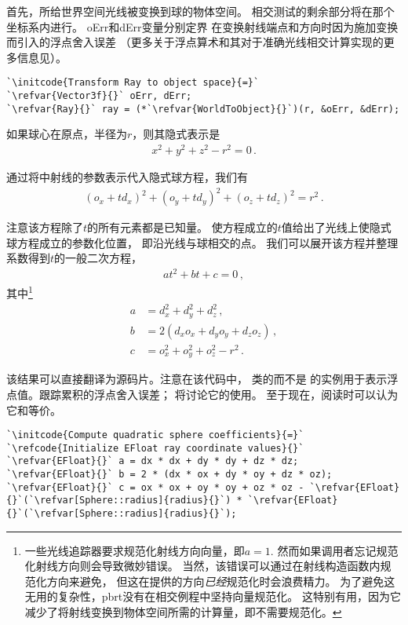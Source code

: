 首先，所给世界空间光线被变换到球的物体空间。
相交测试的剩余部分将在那个坐标系内进行。
{\ttfamily oErr}和{\ttfamily dErr}变量分别定界
在变换射线端点和方向时因为施加变换而引入的浮点舍入误差
（更多关于浮点算术和其对于准确光线相交计算实现的更多信息见）。
\begin{lstlisting}
`\initcode{Transform Ray to object space}{=}`
`\refvar{Vector3f}{}` oErr, dErr;
`\refvar{Ray}{}` ray = (*`\refvar{WorldToObject}{}`)(r, &oErr, &dErr);
\end{lstlisting}

如果球心在原点，半径为$r$，则其隐式表示是
\begin{align*}
    x^2+y^2+z^2-r^2=0\, .
\end{align*}

通过将中射线的参数表示代入隐式球方程，我们有
\begin{align*}
    (o_x+td_x)^2+(o_y+td_y)^2+(o_z+td_z)^2=r^2\, .
\end{align*}

注意该方程除了$t$的所有元素都是已知量。
使方程成立的$t$值给出了光线上使隐式球方程成立的参数化位置，
即沿光线与球相交的点。
我们可以展开该方程并整理系数得到$t$的一般二次方程，
\begin{align*}
    at^2+bt+c=0\, ,
\end{align*}
其中\footnote{一些光线追踪器要求规范化射线方向向量，即$a=1$.
    然而如果调用者忘记规范化射线方向则会导致微妙错误。
    当然，该错误可以通过在射线构造函数内规范化方向来避免，
    但这在提供的方向\emph{已经}规范化时会浪费精力。
    为了避免这无用的复杂性，pbrt没有在相交例程中坚持向量规范化。
    这特别有用，因为它减少了将射线变换到物体空间所需的计算量，即不需要规范化。}
\begin{align*}
    a & =d_x^2+d_y^2+d_z^2\, ,       \\
    b & =2(d_xo_x+d_yo_y+d_zo_z)\, , \\
    c & =o_x^2+o_y^2+o_z^2-r^2\, .
\end{align*}

该结果可以直接翻译为源码片。注意在该代码中，
类的而不是
的实例用于表示浮点值。跟踪累积的浮点舍入误差；
将讨论它的使用。
至于现在，阅读时可以认为它和等价。
\begin{lstlisting}
`\initcode{Compute quadratic sphere coefficients}{=}`
`\refcode{Initialize EFloat ray coordinate values}{}`
`\refvar{EFloat}{}` a = dx * dx + dy * dy + dz * dz;
`\refvar{EFloat}{}` b = 2 * (dx * ox + dy * oy + dz * oz);
`\refvar{EFloat}{}` c = ox * ox + oy * oy + oz * oz - `\refvar{EFloat}{}`(`\refvar[Sphere::radius]{radius}{}`) * `\refvar{EFloat}{}`(`\refvar[Sphere::radius]{radius}{}`);
\end{lstlisting}

